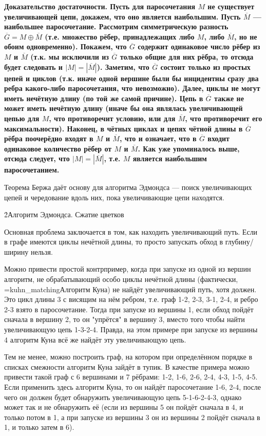 \bf{Доказательство достаточности}. Пусть для паросочетания $M$ не существует увеличивающей цепи, докажем, что оно является наибольшим. Пусть $\overline M$ --- наибольшее паросочетание. Рассмотрим симметрическую разность $\overline G = M \oplus \overline M$ (т.е. множество рёбер, принадлежащих либо $M$, либо $\overline M$, но не обоим одновременно). Покажем, что $\overline G$ содержит одинаковое число рёбер из $M$ и $\overline M$ (т.к. мы исключили из $\overline G$ только общие для них рёбра, то отсюда будет следовать и $|M| = |\overline M|$). Заметим, что $\overline G$ состоит только из простых цепей и циклов (т.к. иначе одной вершине были бы инцидентны сразу два ребра какого-либо паросочетания, что невозможно). Далее, циклы не могут иметь нечётную длину (по той же самой причине). Цепь в $\overline G$ также не может иметь нечётную длину (иначе бы она являлась увеличивающей цепью для $M$, что противоречит условию, или для $\overline M$, что противоречит его максимальности). Наконец, в чётных циклах и цепях чётной длины в $\overline G$ рёбра поочерёдно входят в $M$ и $\overline M$, что и означает, что в $\overline G$ входит одинаковое количество рёбер от $M$ и $\overline M$. Как уже упоминалось выше, отсюда следует, что $|M| = |\overline M|$, т.е. $M$ является наибольшим паросочетанием.

Теорема Бержа даёт основу для алгоритма Эдмондса --- поиск увеличивающих цепей и чередование вдоль них, пока увеличивающие цепи находятся.


\h2{Алгоритм Эдмондса. Сжатие цветков}

Основная проблема заключается в том, как находить увеличивающий путь. Если в графе имеются циклы нечётной длины, то просто запускать обход в глубину/ширину нельзя.

Можно привести простой контрпример, когда при запуске из одной из вершин алгоритм, не обрабатывающий особо циклы нечётной длины (фактически, \algohref=kuhn_matching{Алгоритм Куна}) не найдёт увеличивающий путь, хотя должен. Это цикл длины 3 с висящим на нём ребром, т.е. граф 1-2, 2-3, 3-1, 2-4, и ребро 2-3 взято в паросочетание. Тогда при запуске из вершины 1, если обход пойдёт сначала в вершину 2, то он "упрётся" в вершину 3, вместо того чтобы найти увеличивающую цепь 1-3-2-4. Правда, на этом примере при запуске из вершины 4 алгоритм Куна всё же найдёт эту увеличивающую цепь.


Тем не менее, можно построить граф, на котором при определённом порядке в списках смежности алгоритм Куна зайдёт в тупик. В качестве примера можно привести такой граф с 6 вершинами и 7 рёбрами: 1-2, 1-6, 2-6, 2-4, 4-3, 1-5, 4-5. Если применить здесь алгоритм Куна, то он найдёт паросочетание 1-6, 2-4, после чего он должен будет обнаружить увеличивающую цепь 5-1-6-2-4-3, однако может так и не обнаружить её (если из вершины 5 он пойдёт сначала в 4, и только потом в 1, а при запуске из вершины 3 он из вершины 2 пойдёт сначала в 1, и только затем в 6).

